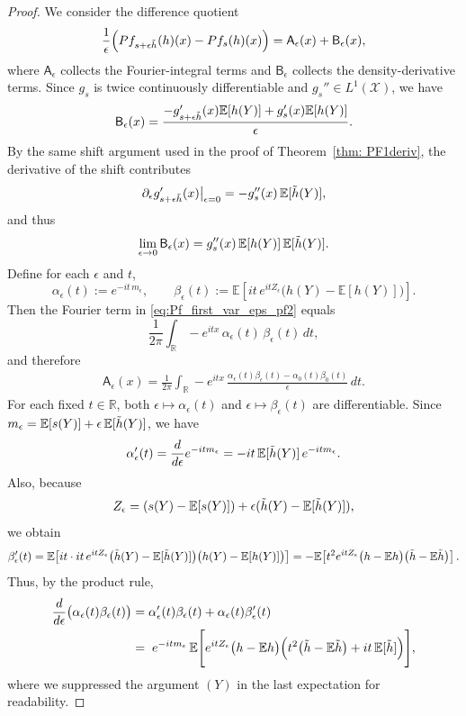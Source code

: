 \documentclass[12pt,leqno]{amsart}
\begin{document}
\begin{proof}
We consider the difference quotient
\begin{align}\label{eq:second_var_start_newletters}
\frac{1}{\epsilon}\Big(Pf_{s+\epsilon\Tilde h}(h)(x)-Pf_s(h)(x)\Big)
=\mathsf{A}_\epsilon(x)+\mathsf{B}_\epsilon(x),
\end{align}
where $\mathsf{A}_\epsilon$ collects the Fourier-integral terms and $\mathsf{B}_\epsilon$ collects the density-derivative terms.
Since $g_s$ is twice continuously differentiable and $g_s''\in L^1(\mathcal{X})$, we have
\[
\mathsf{B}_\epsilon(x)
=
\frac{-g'_{s+\epsilon\Tilde h}(x)\mathbb E[h(Y)]+g'_s(x)\mathbb E[h(Y)]}{\epsilon}.
\]
By the same shift argument used in the proof of Theorem~\ref{thm: PF1deriv}, the derivative of the shift contributes
\[
\partial_\epsilon g'_{s+\epsilon\Tilde h}(x)\big|_{\epsilon=0}
= -g_s''(x)\,\mathbb E[\Tilde h(Y)],
\]
and thus
\begin{align}\label{eq:B_limit}
\lim_{\epsilon\to 0}\mathsf{B}_\epsilon(x)
= g_s''(x)\,\mathbb E[h(Y)]\,\mathbb E[\Tilde h(Y)].
\end{align}
Define for each $\epsilon$ and $t$,
\[
\alpha_\epsilon(t):=e^{-it\,m_\epsilon},\qquad
\beta_\epsilon(t):=\mathbb E\!\left[it\,e^{itZ_\epsilon}\big(h(Y)-\mathbb E[h(Y)]\big)\right].
\]
Then the Fourier term in \eqref{eq:Pf_first_var_eps_pf2} equals
\[
\frac{1}{2\pi}\int_{\mathbb R}-e^{itx}\,\alpha_\epsilon(t)\,\beta_\epsilon(t)\,dt,
\]
and therefore
\begin{align}\label{eq:A_eps}
\mathsf{A}_\epsilon(x)
=\frac{1}{2\pi}\int_{\mathbb R}-e^{itx}\,
\frac{\alpha_\epsilon(t)\beta_\epsilon(t)-\alpha_0(t)\beta_0(t)}{\epsilon}\,dt.
\end{align}
For each fixed $t\in\mathbb R$, both $\epsilon\mapsto \alpha_\epsilon(t)$ and $\epsilon\mapsto \beta_\epsilon(t)$ are differentiable.
Since $m_\epsilon=\mathbb E[s(Y)]+\epsilon\,\mathbb E[\Tilde h(Y)]$, we have
\[
\alpha_\epsilon'(t)=\frac{d}{d\epsilon}e^{-it m_\epsilon}=-it\,\mathbb E[\Tilde h(Y)]\,e^{-it m_\epsilon}.
\]
Also, because
\[
Z_\epsilon=(s(Y)-\mathbb E[s(Y)])+\epsilon(\Tilde h(Y)-\mathbb E[\Tilde h(Y)]),
\]
we obtain
\[
\beta_\epsilon'(t)
=\mathbb E\!\left[it\cdot it\,e^{itZ_\epsilon}\big(\Tilde h(Y)-\mathbb E[\Tilde h(Y)]\big)\big(h(Y)-\mathbb E[h(Y)]\big)\right]
=
-\mathbb E\!\left[t^2 e^{itZ_\epsilon}\big(h-\mathbb E h\big)\big(\Tilde h-\mathbb E\Tilde h\big)\right].
\]
Thus, by the product rule,
\begin{align}\label{eq:alphabeta_prime}
\frac{d}{d\epsilon}\big(\alpha_\epsilon(t)\beta_\epsilon(t)\big)
&=\alpha_\epsilon'(t)\beta_\epsilon(t)+\alpha_\epsilon(t)\beta_\epsilon'(t)\\
&=\;e^{-it m_\epsilon}\,
\mathbb E\Bigg[
e^{itZ_\epsilon}\big(h-\mathbb E h\big)\Big(t^2\big(\Tilde h-\mathbb E\Tilde h\big)+it\,\mathbb E[\Tilde h]\Big)
\Bigg],
\nonumber
\end{align}
where we suppressed the argument $(Y)$ in the last expectation for readability.


\end{proof}
\end{document}
